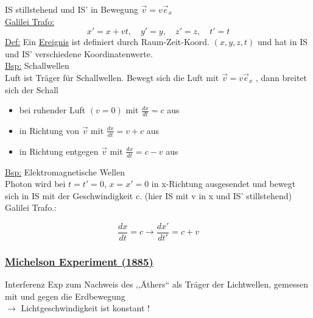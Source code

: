 \documentclass[titlepage,12pt,a4paper,ngerman]{report}
\begin{document}
IS stillstehend und IS' in Bewegung $ \vec{v} = v \vec{e}_x $\\[10pt]
\underline{Galilei Trafo:}
\begin{equation*}
x' = x + vt , \quad y' = y , \quad z' = z, \quad t' = t \tag{1}
\end{equation*}
\underline{Def:} Ein \underline{Ereignis} ist definiert durch Raum-Zeit-Koord. $ (x,y,z,t) $ und hat in IS und IS' verschiedene Koordinatenwerte.\\[10pt]
\underline{Bsp:} Schallwellen\\
Luft ist Träger für Schallwellen. Bewegt sich die Luft mit $ \vec{v} = v \vec{e}_x $ , dann breitet sich der Schall
\begin{itemize}
	\item bei ruhender Luft $ (v=0) $ mit $ \frac{dx}{dt} = c $ aus
	\item in Richtung von $ \vec{v} $ mit $ \frac{dx}{dt} = v+c $ aus
	\item in Richtung entgegen $ \vec{v} $ mit $ \frac{dx}{dt} = c-v $ aus
\end{itemize}
\underline{Bsp:} Elektromagnetische Wellen\\
Photon wird bei $ t = t' = 0 $, $ x = x' = 0 $ in x-Richtung ausgesendet und bewegt sich in IS mit der Geschwindigkeit c. (hier IS mit v in x und IS' stillstehend)\\
Galilei Trafo.:
%

\begin{equation*}
\frac{dx}{dt} = c \longrightarrow \frac{dx'}{dt'} = c+v
\end{equation*}
\subsubsection{\underline{Michelson Experiment (1885)}}
Interferenz Exp zum Nachweis des ,,Äthers`` als Träger der Lichtwellen, gemessen mit und gegen die Erdbewegung\\
$ \rightarrow $ Lichtgeschwindigkeit ist konstant !
\end{document}
